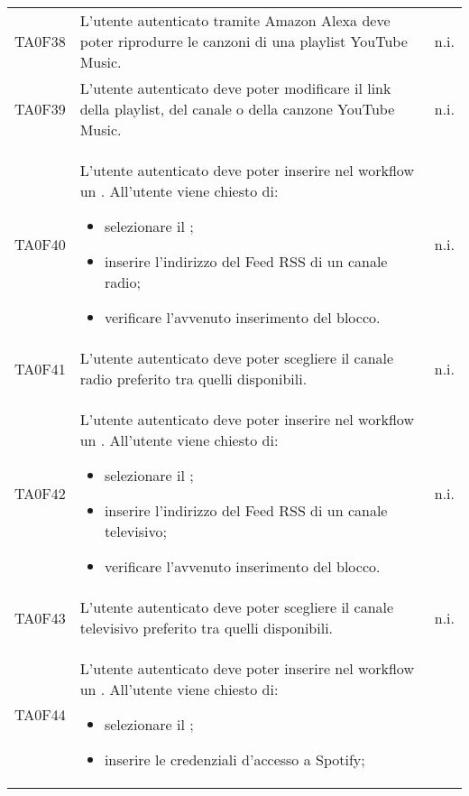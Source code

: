 \begin{center}
\begin{longtable}{ c m{12cm} c }
	TA0F38   & L'utente autenticato tramite Amazon Alexa deve poter riprodurre le canzoni di una playlist YouTube Music.                       										& n.i. \\
	TA0F39   & L'utente autenticato deve poter modificare il link della playlist, del canale o della canzone YouTube Music.             										& n.i. \\
	TA0F40   & L'utente autenticato deve poter inserire nel workflow un \BRadio. All'utente viene chiesto di: \begin{itemize}										
		\item selezionare il \BRadio;										
		\item inserire l'indirizzo del Feed RSS di un canale radio;										
		\item verificare l'avvenuto inserimento del blocco.										
	\end{itemize} 																																								& n.i. \\ 
	TA0F41  & L'utente autenticato deve poter scegliere il canale radio preferito tra quelli disponibili.                               										& n.i. \\
	TA0F42   & L'utente autenticato deve poter inserire nel workflow un \BTV. All'utente viene chiesto di: \begin{itemize}										
		\item selezionare il \BTV;										
		\item inserire l'indirizzo del Feed RSS di un canale televisivo;										
		\item verificare l'avvenuto inserimento del blocco.										
	\end{itemize} 																																								& n.i. \\ 	
	TA0F43   & L'utente autenticato deve poter scegliere il canale televisivo preferito tra quelli disponibili.                          										& n.i. \\
	TA0F44   & L'utente autenticato deve poter inserire nel workflow un \BSpotify. All'utente viene chiesto di: \begin{itemize}										
		\item selezionare il \BSpotify;										
		\item inserire le credenziali d'accesso a Spotify;										

\end{itemize}
\end{longtable}
\end{center}

